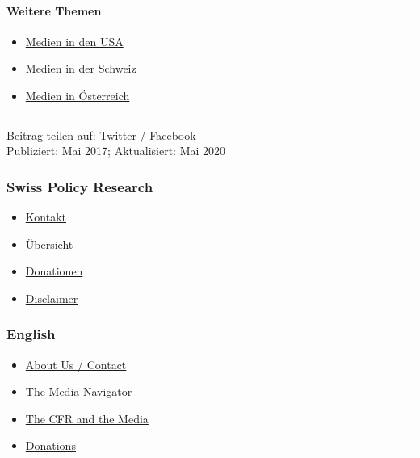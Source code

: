 \hypertarget{weitere-themen}{%
\paragraph{Weitere Themen}\label{weitere-themen}}

\begin{itemize}
\tightlist
\item
  \href{https://swprs.org/das-american-empire-und-seine-medien/}{Medien
  in den USA}
\item
  \href{https://swprs.org/netzwerk-medien-schweiz/}{Medien in der
  Schweiz}
\item
  \href{https://swprs.org/medien-in-oesterreich/}{Medien in Österreich}
\end{itemize}

\begin{center}\rule{0.5\linewidth}{\linethickness}\end{center}

Beitrag teilen auf:
\href{https://twitter.com/intent/tweet?url=https://swprs.org/netzwerk-medien-deutschland/}{Twitter}
/
\href{https://www.facebook.com/share.php?u=https://swprs.org/netzwerk-medien-deutschland/}{Facebook}\\
Publiziert: Mai 2017; Aktualisiert: Mai 2020

\hypertarget{swiss-policy-research}{%
\subsubsection{Swiss Policy Research}\label{swiss-policy-research}}

\begin{itemize}
\tightlist
\item
  \href{https://swprs.org/kontakt/}{Kontakt}
\item
  \href{https://swprs.org/uebersicht/}{Übersicht}
\item
  \href{https://swprs.org/donationen/}{Donationen}
\item
  \href{https://swprs.org/disclaimer/}{Disclaimer}
\end{itemize}

\hypertarget{english}{%
\subsubsection{English}\label{english}}

\begin{itemize}
\tightlist
\item
  \href{https://swprs.org/contact/}{About Us / Contact}
\item
  \href{https://swprs.org/media-navigator/}{The Media Navigator}
\item
  \href{https://swprs.org/the-american-empire-and-its-media/}{The CFR
  and the Media}
\item
  \href{https://swprs.org/donations/}{Donations}
\end{itemize}

